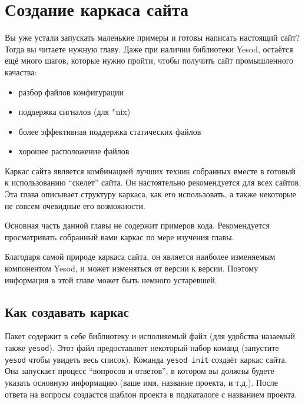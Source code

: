 \chapter{Создание каркаса сайта}\label{chap:scaffolding}

Вы уже устали запускать маленькие примеры и готовы написать настоящий сайт?
Тогда вы читаете нужную главу. Даже при наличии библиотеки Yesod,
остаётся ещё много шагов, которые нужно пройти, чтобы получить сайт
промышленного качаства:

\begin{itemize}
  \item разбор файлов конфигурации
  \item поддержка сигналов (для *nix)
  \item более эффективная поддержка статических файлов
  \item хорошее расположение файлов 
\end{itemize}

Каркас сайта является комбинацией лучших техник собранных вместе в готовый к 
использованию ``скелет'' сайта. Он настоятельно рекомендуется для всех сайтов.
Эта глава описывает структуру каркаса, как его использовать, а также некоторые 
не совсем очевидные его возможности.

Основная часть данной главы не содержит примеров кода. Рекомендуется 
просматривать собранный вами каркас по мере изучения главы.

\begin{remark}
  Благодаря самой природе каркаса сайта, он является наиболее изменяемым компонентом Yesod, и 
  может изменяться от версии к версии. Поэтому информация в этой главе может быть немного устаревшей.
\end{remark}

\section{Как создавать каркас}

Пакет 
содержит в себе библиотеку и исполняемый файл (для удобства 
назаемый также \lstinline!yesod!). Этот файл предоставляет некоторый набор 
команд (запустите \lstinline!yesod! чтобы увидеть весь список). Команда
\lstinline!yesod init! создаёт каркас сайта. Она запускает процесс
``вопросов и ответов'', в котором вы должны будете указать основную информацию
(ваше имя, название проекта, и т.д.). После ответа на вопросы создастся 
шаблон проекта в подкаталоге с названием проекта.

